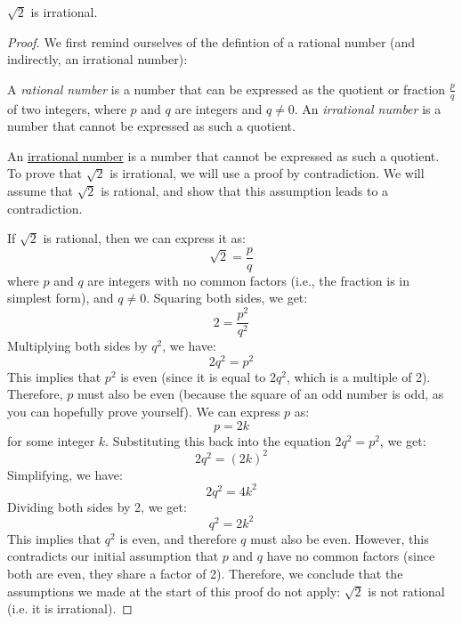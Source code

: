 \begin{proposition}
    $\sqrt{2}$ is irrational.
\end{proposition}
\begin{proof}
    We first remind ourselves of the defintion of a rational number (and indirectly, an irrational number):
    \begin{definition}\label{def:rational-number}
        A \textit{rational number} is a number that can be expressed as the quotient or fraction $\frac{p}{q}$ of two integers,
        where $p$ and $q$ are integers and $q \neq 0$. An \textit{irrational number} is a number that cannot be expressed as such a quotient.
    \end{definition}
    An \hyperref[def:rational-number]{irrational number} is a number that cannot be expressed as such a quotient. To prove that $\sqrt{2}$ is irrational,
    we will use a proof by contradiction. We will assume that $\sqrt{2}$ is rational, and show that this assumption leads to a contradiction.

    If $\sqrt{2}$ is rational, then we can express it as:
    \begin{equation*}
        \sqrt{2} = \frac{p}{q}
    \end{equation*}
    where $p$ and $q$ are integers with no common factors (i.e., the fraction is in simplest form), and $q \neq 0$.
    Squaring both sides, we get:
    \begin{equation*}
        2 = \frac{p^2}{q^2}
    \end{equation*}
    Multiplying both sides by $q^2$, we have:
    \begin{equation*}
        2q^2 = p^2
    \end{equation*}
    This implies that $p^2$ is even (since it is equal to $2q^2$, which is a multiple of 2). Therefore, $p$ must also be even
    (because the square of an odd number is odd, as you can hopefully prove yourself). We can express $p$ as:
    \begin{equation*}
        p = 2k
    \end{equation*}
    for some integer $k$. Substituting this back into the equation $2q^2 = p^2$, we get:
    \begin{equation*}
        2q^2 = (2k)^2
    \end{equation*}
    Simplifying, we have:
    \begin{equation*}
        2q^2 = 4k^2
    \end{equation*}
    Dividing both sides by 2, we get:
    \begin{equation*}
        q^2 = 2k^2
    \end{equation*}
    This implies that $q^2$ is even, and therefore $q$ must also be even. However, this contradicts our initial assumption that $p$ and $q$ have
    no common factors (since both are even, they share a factor of 2). Therefore, we conclude that the assumptions we made at the start 
    of this proof do not apply: $\sqrt{2}$ is not rational (i.e. it is irrational).
\end{proof}

